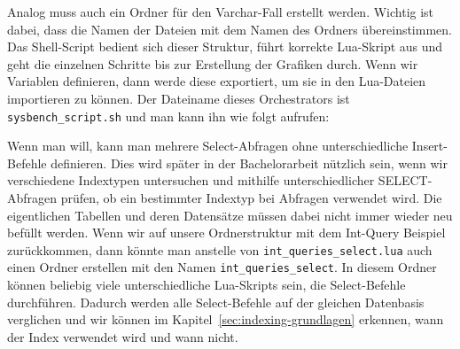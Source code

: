 Analog muss auch ein Ordner für den Varchar-Fall erstellt werden.
Wichtig ist dabei, dass die Namen der Dateien mit dem Namen des Ordners übereinstimmen.
Das Shell-Script bedient sich dieser Struktur, führt korrekte Lua-Skript aus und geht die einzelnen Schritte bis zur Erstellung der Grafiken durch.
Wenn wir Variablen definieren, dann werde diese exportiert, um sie in den Lua-Dateien importieren zu können.
Der Dateiname dieses Orchestrators ist \texttt{sysbench\_script.sh} und man kann ihn wie folgt aufrufen:

\vspace{-10pt}

\vspace{-5pt}

Wenn man will, kann man mehrere Select-Abfragen ohne unterschiedliche Insert-Befehle definieren.
Dies wird später in der Bachelorarbeit nützlich sein, wenn wir verschiedene Indextypen untersuchen und mithilfe unterschiedlicher SELECT-Abfragen prüfen, ob ein bestimmter Indextyp bei Abfragen verwendet wird.
Die eigentlichen Tabellen und deren Datensätze müssen dabei nicht immer wieder neu befüllt werden.
Wenn wir auf unsere Ordnerstruktur mit dem Int-Query Beispiel zurückkommen, dann könnte man anstelle von \texttt{int\_queries\_select.lua} auch einen Ordner erstellen mit den Namen \texttt{int\_queries\_select}.
In diesem Ordner können beliebig viele unterschiedliche Lua-Skripts sein, die Select-Befehle durchführen.
Dadurch werden alle Select-Befehle auf der gleichen Datenbasis verglichen und wir können im Kapitel~\ref{sec:indexing-grundlagen} erkennen, wann der Index verwendet wird und wann nicht.

